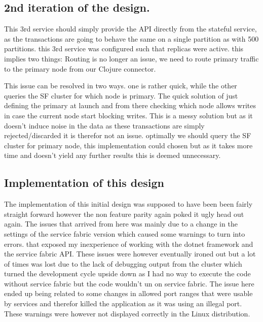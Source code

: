 \documentclass[a4paper,10pt,titlepage]{report}
\begin{document}
    \subsection{2nd iteration of the design.}

    This 3rd service should simply provide the API directly from the stateful service, as the transactions are going to behave the same on a single partition as with 500 partitions. this 3rd service was configured such that replicas were active. this implies two things: Routing is no longer an issue, we need to route primary traffic to the primary node from our Clojure connector.

    This issue can be resolved in two ways. one is rather quick, while the other queries the SF cluster for which node is primary. The quick solution of just defining the primary at launch and from there checking which node allows writes in case the current node start blocking writes. This is a messy solution but as it doesn't induce noise in the data as these transactions are simply rejected/discarded it is therefor not an issue. optimally we should query the SF cluster for primary node, this implementation could chosen but as it takes more time and doesn't yield any further results this is deemed unnecessary.

    \subsection{Implementation of this design}


    The implementation of this initial design was supposed to have been been fairly straight forward however the non feature parity again poked it ugly head out again. The issues that arrived from here was mainly due to a change in the settings of the service fabric version which caused some warnings to turn into errors. that exposed my inexperience of working with the dotnet framework and the service fabric API. These issues were however eventually ironed out but a lot of times was lost due to the lack of debugging output from the cluster which turned the development cycle upside down as I had no way to execute the code without service fabric but the code wouldn't un on service fabric. The issue here ended up being related to some changes in allowed port ranges that were usable by services and therefor killed the application as it was using an illegal port. These warnings were however not displayed correctly in the Linux distribution.
\end{document}
